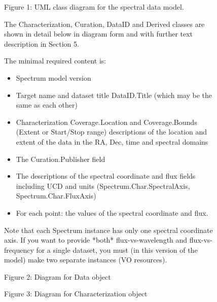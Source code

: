 \documentclass[11pt]{article}
\begin{document}
\begin{figure}[h]



\colorbox{iblue}{
}



{
\colorbox{iblue}{
\begin{minipage}{6.0in}
Figure 1: 
UML class diagram for the spectral data model.

The Characterization, Curation, DataID and Derived classes are 
shown in detail below in diagram form and
with further text description in Section 5.

The minimal required content is:

\begin{itemize}
\item Spectrum model version
\item Target name and dataset title DataID.Title (which may be the same as each other)
\item  Characterization Coverage.Location and Coverage.Bounds (Extent or Start/Stop range) descriptions
       of the location and extent of the data in the RA, Dec, time and spectral domains
\item  The Curation.Publisher field
\item  The descriptions of the spectral coordinate and flux
fields including UCD and units  (Spectrum.Char.SpectralAxis, Spectrum.Char.FluxAxis)
\item  For each point: the values of the spectral coordinate and flux.
\end{itemize}


Note that each Spectrum instance has only one spectral coordinate axis.
If you want to provide *both* flux-vs-wavelength and flux-vs-frequency
for a single dataset, you must (in this version of the model)
make two separate instances (VO resources).

\end{minipage}
}
}
\end{figure}

\begin{figure}[h]

\colorbox{iblue}{
}
{
\colorbox{iblue}{
\begin{minipage}{6.0in}
Figure 2: Diagram for Data object

\end{minipage}
}
}

\colorbox{iblue}{
}
{
\colorbox{iblue}{
\begin{minipage}{6.0in}
Figure 3: Diagram for Characterization object
\end{minipage}
}
}

\end{figure}
\end{document}
